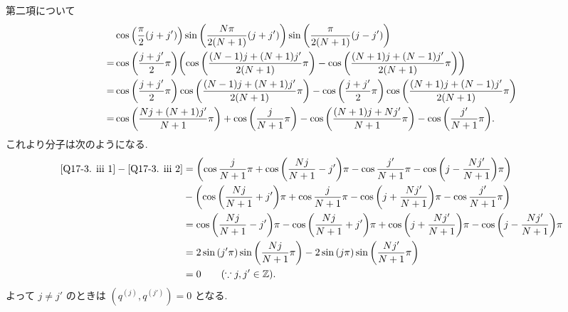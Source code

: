 \documentclass[uplatex,dvipdfmx,a4paper,11pt]{jlreq}
\theoremstyle{definition}
\newcommand{\ZZ}{\mathbb{Z}}
\begin{document}
第二項について
\begin{align}
    & \cos\qty(\frac{\pi}{2}(j + j'))\sin\qty(\frac{N\pi}{2(N+1)}(j + j'))\sin\qty(\frac{\pi}{2(N+1)}(j - j'))                                                       \\
  = & \cos\qty(\frac{j + j'}{2}\pi)\qty(\cos\qty(\frac{(N-1)j + (N+1)j'}{2(N+1)}\pi) - \cos\qty(\frac{(N+1)j + (N-1)j'}{2(N+1)}\pi))                                 \\
  = & \cos\qty(\frac{j + j'}{2}\pi)\cos\qty(\frac{(N-1)j + (N+1)j'}{2(N+1)}\pi) - \cos\qty(\frac{j + j'}{2}\pi)\cos\qty(\frac{(N+1)j + (N-1)j'}{2(N+1)}\pi)          \\
  = & \cos\qty(\frac{Nj + (N+1)j'}{N+1}\pi) + \cos\qty(\frac{j}{N+1}\pi) - \cos\qty(\frac{(N+1)j + Nj'}{N+1}\pi) - \cos\qty(\frac{j'}{N+1}\pi). \label{Q17-3. iii 2}
\end{align}
これより分子は次のようになる.
\begin{align}
  \eqref{Q17-3. iii 1} - \eqref{Q17-3. iii 2} & = \qty(\cos\frac{j}{N+1}\pi + \cos\qty(\frac{Nj}{N+1} - j')\pi - \cos\frac{j'}{N+1}\pi - \cos\qty(j - \frac{Nj'}{N+1})\pi)                  \\
                                              & - \qty(\cos\qty(\frac{Nj}{N+1} + j')\pi + \cos\frac{j}{N+1}\pi - \cos\qty(j + \frac{Nj'}{N+1})\pi - \cos\frac{j'}{N+1}\pi)                  \\
                                              & = \cos\qty(\frac{Nj}{N+1} - j')\pi - \cos\qty(\frac{Nj}{N+1} + j')\pi + \cos\qty(j + \frac{Nj'}{N+1})\pi - \cos\qty(j - \frac{Nj'}{N+1})\pi \\
                                              & = 2\sin\qty(j'\pi)\sin\qty(\frac{Nj}{N+1}\pi) - 2\sin\qty(j\pi)\sin\qty(\frac{Nj'}{N+1}\pi)                                                 \\
                                              & = 0 \qquad (\because j, j'\in\ZZ).
\end{align}
よって $j \neq j'$ のときは $(q^{(j)}, q^{(j')}) = 0$ となる.
\end{document}
